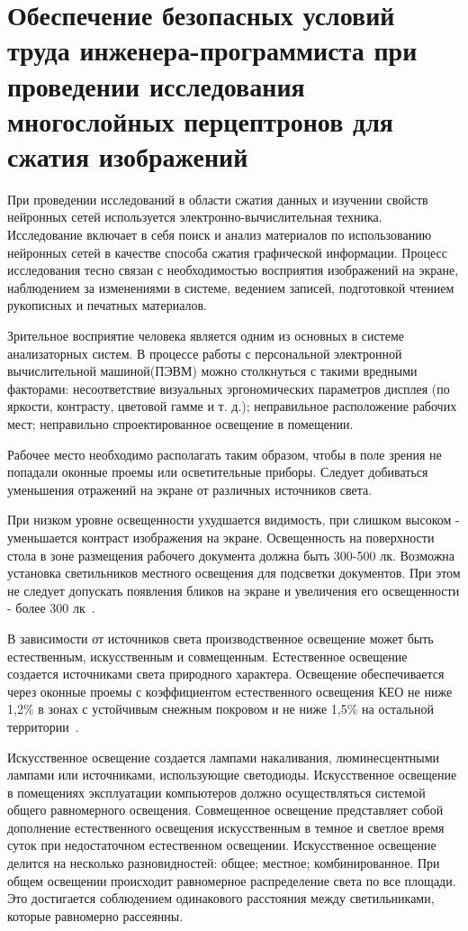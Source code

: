 \chapter{Обеспечение безопасных условий труда инженера-программиста при проведении исследования многослойных перцептронов для сжатия изображений}

При проведении исследований в области сжатия данных и изучении свойств нейронных сетей используется электронно-вычислительная техника.
Исследование включает в себя поиск и анализ материалов по использованию нейронных сетей в качестве способа сжатия графической информации.
Процесс исследования тесно связан с необходимостью восприятия изображений на экране, наблюдением за изменениями в системе, ведением записей, подготовкой чтением рукописных и печатных материалов.

Зрительное восприятие человека является одним из основных в системе анализаторных систем.
В процессе работы с персональной электронной вычислительной машиной(ПЭВМ) можно столкнуться с такими вредными факторами: несоответствие визуальных эргономических параметров дисплея (по яркости, контрасту, цветовой гамме и т. д.); неправильное расположение рабочих мест; неправильно спроектированное освещение в помещении.

Рабочее место необходимо располагать таким образом, чтобы в поле зрения не попадали оконные проемы или осветительные приборы. Следует добиваться уменьшения отражений на экране от различных источников света.

При низком уровне освещенности ухудшается видимость, при слишком высоком - уменьшается контраст изображения на экране.
Освещенность на поверхности стола в зоне размещения рабочего документа должна быть 300-500 лк.
Возможна установка светильников местного освещения для подсветки документов.
При этом не следует допускать появления бликов на экране и увеличения его освещенности - более 300 лк~\cite{ot_electric_lighting}.

В зависимости от источников света производственное освещение может быть естественным, искусственным и совмещенным.
Естественное освещение создается источниками света природного характера.
Освещение обеспечивается через оконные проемы с коэффициентом естественного освещения КЕО не ниже 1,2\% в зонах с устойчивым снежным покровом и не ниже 1,5\% на остальной территории~\cite{ot_electric_lighting}.

Искусственное освещение создается лампами накаливания, люминесцентными лампами или источниками, использующие светодиоды.
Искусственное освещение в помещениях эксплуатации компьютеров должно осуществляться системой общего равномерного освещения.
Совмещенное освещение представляет собой дополнение естественного освещения искусственным в темное и светлое время суток при недостаточном естественном освещении.
Искусственное освещение делится на несколько разновидностей: общее; местное; комбинированное.
При общем освещении происходит равномерное распределение света по все площади.
Это достигается соблюдением одинакового расстояния между светильниками, которые равномерно рассеянны.

